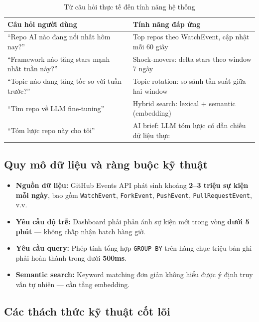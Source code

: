 \documentclass[12pt,a4paper]{article}
\newcommand{\tech}[1]{\texttt{#1}}
\newcommand{\kw}[1]{\textbf{#1}}
\begin{document}
\begin{table}[H]
  \centering
  \caption{Từ câu hỏi thực tế đến tính năng hệ thống}
  \begin{tabularx}{\linewidth}{Xp{5.5cm}}
    \toprule
    \textbf{Câu hỏi người dùng} & \textbf{Tính năng đáp ứng} \\
    \midrule
    ``Repo AI nào đang nổi nhất hôm nay?''
      & Top repos theo WatchEvent, cập nhật mỗi 60 giây \\
    ``Framework nào tăng stars mạnh nhất tuần này?''
      & Shock-movers: delta stars theo window 7 ngày \\
    ``Topic nào đang tăng tốc so với tuần trước?''
      & Topic rotation: so sánh tần suất giữa hai window \\
    ``Tìm repo về LLM fine-tuning''
      & Hybrid search: lexical + semantic (embedding) \\
    ``Tóm lược repo này cho tôi''
      & AI brief: LLM tóm lược có dẫn chiếu dữ liệu thực \\
    \bottomrule
  \end{tabularx}
\end{table}

\subsection{Quy mô dữ liệu và ràng buộc kỹ thuật}

\begin{itemize}[leftmargin=1.5em]
  \item \kw{Nguồn dữ liệu:} GitHub Events API phát sinh khoảng
        \kw{2--3 triệu sự kiện mỗi ngày}, bao gồm \tech{WatchEvent},
        \tech{ForkEvent}, \tech{PushEvent}, \tech{PullRequestEvent}, v.v.
  \item \kw{Yêu cầu độ trễ:} Dashboard phải phản ánh sự kiện mới
        trong vòng \kw{dưới 5 phút} --- không chấp nhận batch hàng giờ.
  \item \kw{Yêu cầu query:} Phép tính tổng hợp \tech{GROUP BY} trên
        hàng chục triệu bản ghi phải hoàn thành trong dưới \kw{500ms}.
  \item \kw{Semantic search:} Keyword matching đơn giản không hiểu
        được ý định truy vấn tự nhiên --- cần tầng embedding.
\end{itemize}

\subsection{Các thách thức kỹ thuật cốt lõi}
\end{document}
